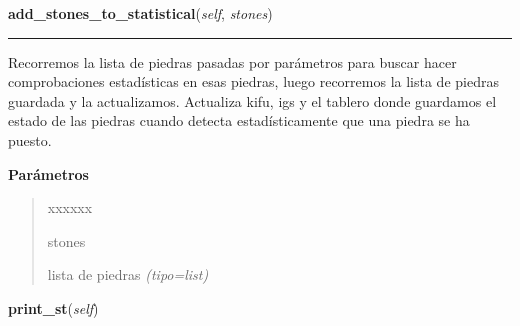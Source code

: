     \label{src:goban:Goban:add_stones_to_statistical}

    \vspace{0.5ex}

\hspace{.8\funcindent}\begin{boxedminipage}{\funcwidth}

    \raggedright \textbf{add\_stones\_to\_statistical}(\textit{self}, \textit{stones})

    \vspace{-1.5ex}

    \rule{\textwidth}{0.5\fboxrule}
\setlength{\parskip}{2ex}
Recorremos la lista de piedras pasadas por parámetros para buscar hacer comprobaciones estadísticas en esas piedras, luego recorremos la lista de piedras guardada y la actualizamos. Actualiza kifu, igs y el tablero donde guardamos el estado de las piedras cuando detecta estadísticamente que una piedra se ha puesto.

\setlength{\parskip}{1ex}
      \textbf{Parámetros}
      \vspace{-1ex}

      \begin{quote}
        \begin{Ventry}{xxxxxx}

          \item[stones]


lista de piedras
            {\it (tipo=list)}

        \end{Ventry}

      \end{quote}

    \end{boxedminipage}

    \label{src:goban:Goban:print_st}

    \vspace{0.5ex}

\hspace{.8\funcindent}\begin{boxedminipage}{\funcwidth}

    \raggedright \textbf{print\_st}(\textit{self})

\setlength{\parskip}{2ex}
\setlength{\parskip}{1ex}
    \end{boxedminipage}

